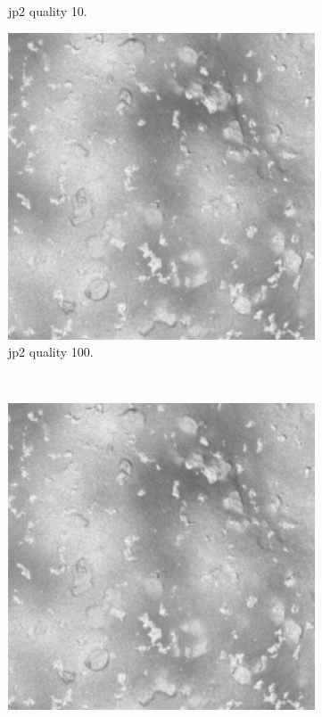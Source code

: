 \begin{figure}[htb]
\begin{subfigure}[b]{0.44\textwidth}
            \caption{\gls{jp2} quality 10.}
            \label{fig:img_quality_10}
        \end{subfigure}
        \begin{subfigure}[b]{0.44\textwidth}
            \centering
            \includegraphics[width=\textwidth]{doc/thesis/0_figures/compare_quality/set1/center/jp2_100_center.png}
            \caption{\gls{jp2} quality 100.}
            \label{fig:img_quality_100}
        \end{subfigure}
        \\
        \begin{subfigure}[b]{0.44\textwidth}
            \centering
            \includegraphics[width=\textwidth]{doc/thesis/0_figures/compare_quality/set1/center/jp2_1000_center.png}

\end{subfigure}
\end{figure}
